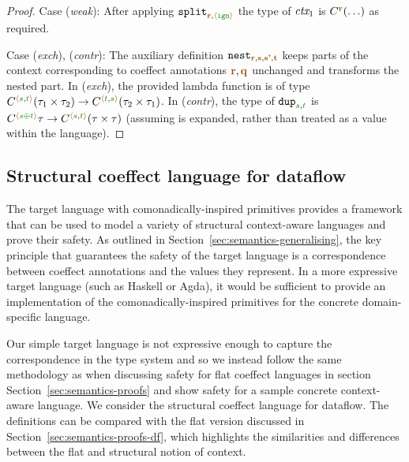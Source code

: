 \begin{proof}
\vspace{0.25em}\noindent\hangindent=0.6cm
Case (\emph{weak}): After applying $\ident{split}_{\aclrd{\textbf{r}}, \alift{\czero}}$ the type of
  $\textit{ctx}_1$ is $\ctyp{\aclrd{\textbf{r}}}(\ldots)$ as required.

\vspace{0.25em}\noindent\hangindent=0.6cm
Case (\emph{exch}), (\emph{contr}): The auxiliary definition $\ident{nest}_{\aclrd{\textbf{r}}, \aclrd{\textbf{s}}, \aclrd{\textbf{s'}}, \aclrd{\textbf{t}}}$
  keeps parts of the context corresponding to coeffect annotations $\aclrd{\textbf{r}}, \aclrd{\textbf{q}}$ unchanged and transforms
  the nested part. In (\emph{exch}), the provided lambda function is of type $\ctyp{\alift{\cclrd{s},\cclrd{t}}}{(\tau_1\times\tau_2)}
  \rightarrow \ctyp{\alift{\cclrd{t},\cclrd{s}}}{(\tau_2\times\tau_1)}$. In (\emph{contr}), the type of
  $\ident{dup}_{\cclrd{s},\cclrd{t}}$ is $\ctyp{\alift{\cclrd{s}\cpar\cclrd{t}}}{\tau} \rightarrow \ctyp{\alift{\cclrd{s},\cclrd{t}}}{(\tau\times\tau)}$
  (assuming  is expanded, rather than treated as a value within the language).
\end{proof}


\subsection{Structural coeffect language for dataflow}
\label{sec:struct-transl-safety}

The target language with comonadically-inspired primitives provides a framework that can be used
to model a variety of structural context-aware languages and prove their safety. As outlined in
Section~\ref{sec:semantics-generalising}, the key principle that guarantees the safety of the
target language is a correspondence between coeffect annotations and the values they represent.
In a more expressive target language (such as Haskell or Agda), it would be sufficient to
provide an implementation of the comonadically-inspired primitives for the concrete domain-specific
language.

Our simple target language is not expressive enough to capture the correspondence in the type
system and so we instead follow the same methodology as when discussing safety for flat coeffect
languages in section Section~\ref{sec:semantics-proofs} and show safety for a sample concrete
context-aware language. We consider the structural coeffect language for dataflow. The definitions
can be compared with the flat version discussed in Section~\ref{sec:semantics-proofs-df}, which
highlights the similarities and differences between the flat and structural notion of context.

